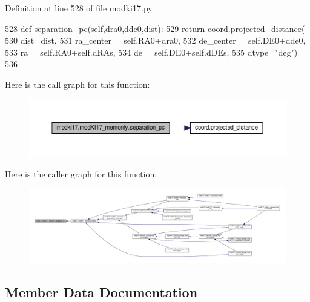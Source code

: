 Definition at line 528 of file modki17.\+py.


\begin{DoxyCode}
528     \textcolor{keyword}{def }separation\_pc(self,dra0,dde0,dist):
529         \textcolor{keywordflow}{return} \hyperlink{namespacecoord_a46aebc3089e078f4597812fecdd0975f}{coord.projected\_distance}(
530             dist=dist,
531             ra\_center = self.RA0+dra0,
532             de\_center = self.DE0+dde0,
533             ra = self.RA0+self.dRAs,
534             de = self.DE0+self.dDEs,
535             dtype=\textcolor{stringliteral}{"deg"})
536 
\end{DoxyCode}
Here is the call graph for this function\+:\nopagebreak
\begin{figure}[H]
\begin{center}
\leavevmode
\includegraphics[width=350pt]{df/da2/classmodki17_1_1modKI17__memonly_ae46bea8dc18dc3d68cd1fe560da8eee8_cgraph}
\end{center}
\end{figure}
Here is the caller graph for this function\+:\nopagebreak
\begin{figure}[H]
\begin{center}
\leavevmode
\includegraphics[width=350pt]{df/da2/classmodki17_1_1modKI17__memonly_ae46bea8dc18dc3d68cd1fe560da8eee8_icgraph}
\end{center}
\end{figure}


\subsection{Member Data Documentation}
\mbox{\label{classmodki17_1_1modKI17__memonly_a193da8b47599eb4a1c60ae080d7475c1}} 
